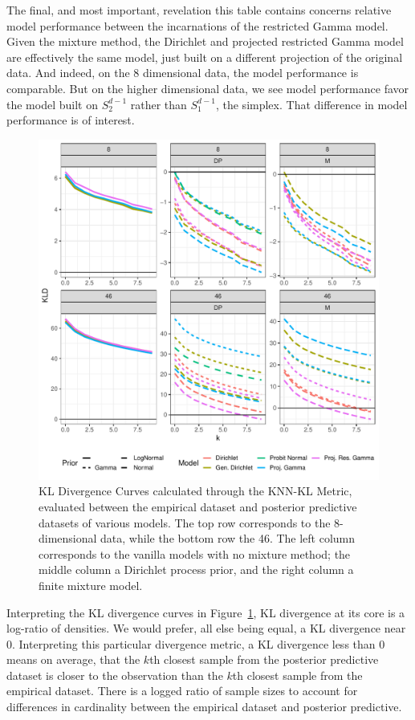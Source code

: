 The final, and most important, revelation this table contains concerns relative model performance
  between the incarnations of the restricted Gamma model.  Given the mixture method, the Dirichlet
  and projected restricted Gamma model are effectively the same model, just built on a different
  projection of the original data.  And indeed, on the 8 dimensional data, the model performance is
  comparable.  But on the higher dimensional data, we see model performance favor the model built on
  $S_{2}^{d-1}$ rather than $S_1^{d-1}$, the simplex.  That difference in model performance is of
  interest.

\begin{figure}[h]
  \centering
  \label{fig:knnkl}
  \includegraphics[width = 5in]{./images/kl_divergence_curves}
  \caption{KL Divergence Curves calculated through the KNN-KL Metric, evaluated between the empirical
  dataset and posterior predictive datasets of various models.  The top row corresponds to the
  8-dimensional data, while the bottom row the 46.  The left column corresponds to the vanilla models
  with no mixture method; the middle column a Dirichlet process prior, and the right column a finite
  mixture model.}
\end{figure}

Interpreting the KL divergence curves in Figure~\ref{fig:knnkl}, KL divergence at its core is a
  log-ratio of densities.  We would prefer, all else being equal, a KL divergence near 0.
  Interpreting this particular divergence metric, a KL divergence less than 0 means on average,
  that the $k$th closest sample from the posterior predictive dataset is closer to the observation
  than the $k$th closest sample from the empirical dataset.  There is a logged ratio of sample sizes
  to account for differences in cardinality between the empirical dataset and posterior predictive.

